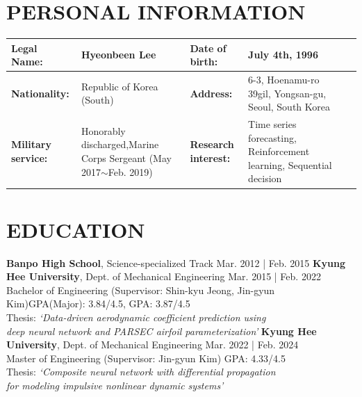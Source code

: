 \documentclass[a4paper,10pt]{extarticle}
\begin{document}
\renewcommand*{\arraystretch}{1.5}
\noindent
\section*{PERSONAL INFORMATION}
\begin{center}
	\vspace*{-0.8cm}
	\noindent
	\begin{longtable}{LRLRLR}
		\textbf{Legal Name:}       & Hyeonbeen Lee                                                                            & \textbf{Date of birth:}     & July 4th, 1996                                                       \\
		\hline
		\textbf{Nationality:}      & Republic of Korea (South)                                                                & \textbf{Address:}           & 6-3, Hoenamu-ro 39gil, Yongsan-gu, Seoul, South Korea                \\
		\hline
		\textbf{Military service:} & Honorably discharged,\linebreak Marine Corps Sergeant {\small (May 2017$\sim$Feb. 2019)} & \textbf{Research interest:} & Time series forecasting, Reinforcement learning, Sequential decision \\
		\hline
	\end{longtable}
\end{center}

\section*{EDUCATION}
\noindent
\textbf{Banpo High School}, Science-specialized Track \hfill Mar. 2012 | Feb. 2015
\newline
\textbf{Kyung Hee University}, Dept. of Mechanical Engineering \hfill Mar. 2015 | Feb. 2022\\ %
Bachelor of Engineering (Supervisor: Shin-kyu Jeong, Jin-gyun Kim)\hfill GPA(Major): 3.84/4.5, GPA: 3.87/4.5\\ %
Thesis: \textit{{\small `Data-driven aerodynamic coefficient prediction using}}\\
\hspace*{1.3cm}\textit{{\small deep neural
			network and PARSEC airfoil parameterization'}}
\newline
\textbf{Kyung Hee University}, Dept. of Mechanical Engineering \hfill Mar. 2022 | Feb. 2024\\ %
Master of Engineering (Supervisor: Jin-gyun Kim) \hfill GPA: 4.33/4.5\\ %
Thesis: \textit{{\small `Composite neural network with differential propagation}}\\
\hspace*{1.3cm}\textit{\small{for modeling impulsive nonlinear dynamic systems'}}
\end{document}
